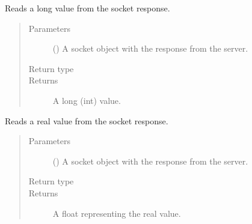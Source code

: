 \documentclass[letterpaper,10pt,english]{sphinxmanual}
\begin{document}

\begin{fulllineitems}
\label{\detokenize{index:secondodb.api.support.secondoinputhandler.read_long}}
Reads a long value from the socket response.
\begin{quote}\begin{description}
\item[{Parameters}] \leavevmode
{} () \textendash{} A socket object with the response from the  server.

\item[{Return type}] \leavevmode
{}

\item[{Returns}] \leavevmode
A long (int) value.

\end{description}\end{quote}

\end{fulllineitems}


\begin{fulllineitems}
\label{\detokenize{index:secondodb.api.support.secondoinputhandler.read_real}}
Reads a real value from the socket response.
\begin{quote}\begin{description}
\item[{Parameters}] \leavevmode
{} () \textendash{} A socket object with the response from the  server.

\item[{Return type}] \leavevmode
{}

\item[{Returns}] \leavevmode
A float representing the real value.

\end{description}\end{quote}

\end{fulllineitems}
\end{document}
